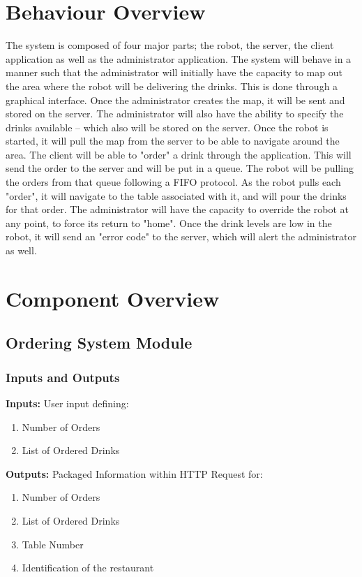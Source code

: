 \documentclass [10pt]{article}
\begin{document}
\section{Behaviour Overview}
The system is composed of four major parts; the robot, the server, the client application as well as the administrator application. The system will behave in a manner such that the administrator will initially have the capacity to map out the area where the robot will be delivering the drinks. This is done through a graphical interface. Once the administrator creates the map, it will be sent and stored on the server. The administrator will also have the ability to specify the drinks available – which also will be stored on the server. Once the robot is started, it will pull the map from the server to be able to navigate around the area. The client will be able to "order" a drink through the application. This will send the order to the server and will be put in a queue. The robot will be pulling the orders from that queue following a FIFO protocol. As the robot pulls each "order", it will navigate to the table associated with it, and will pour the drinks for that order. The administrator will have the capacity to override the robot at any point, to force its return to "home". Once the drink levels are low in the robot, it will send an "error code" to the server, which will alert the administrator as well.

\section{Component Overview}
\subsection{Ordering System Module}

\subsubsection{Inputs and Outputs}

\textbf{Inputs: } User input defining:
\begin{enumerate}
	\item Number of Orders
	\item List of Ordered Drinks
\end{enumerate}

\textbf{Outputs: } Packaged Information within HTTP Request for:
\begin{enumerate}
	\item Number of Orders
	\item List of Ordered Drinks
	\item Table Number
	\item Identification of the restaurant
\end{enumerate}
\end{document}
